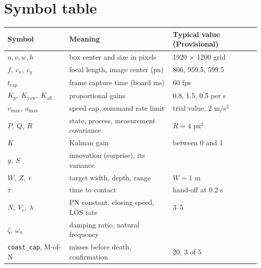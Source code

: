 \documentclass[10pt]{article}
\newcommand{\code}[1]{\textcolor{code}{\texttt{#1}}}
\begin{document}
\section*{Symbol table}
\begin{center}
\small
\begin{tabular}{@{}lll@{}}
\toprule
Symbol & Meaning & Typical value (Provisional) \\
\midrule
$u, v, w, h$ & box center and size in pixels & 1920 $\times$ 1200 grid \\
$f,\ c_x,\ c_y$ & focal length, image center (px) & 806, 959.5, 599.5 \\
$t_\text{cap}$ & frame capture time (board ms) & 60 fps \\
$K_p,\ K_\text{yaw},\ K_\text{alt}$ & proportional gains & 0.8, 1.5, 0.5 per s \\
$v_\text{max},\ a_\text{max}$ & speed cap, command rate limit & trial value, 2 m/s$^2$ \\
$P,\ Q,\ R$ & state, process, measurement covariance & $R = 4$ px$^2$ \\
$K$ & Kalman gain & between 0 and 1 \\
$y,\ S$ & innovation (surprise), its variance & \\
$W,\ Z,\ r$ & target width, depth, range & $W = 1$ m \\
$\tau$ & time to contact & hand-off at 0.2 s \\
$N,\ V_c,\ \dot\lambda$ & PN constant, closing speed, LOS rate & 3--5 \\
$\zeta,\ \omega_n$ & damping ratio, natural frequency & \\
\code{coast\_cap}, M-of-N & misses before death, confirmation & 20, 3 of 5 \\
\bottomrule
\end{tabular}
\end{center}
\end{document}
